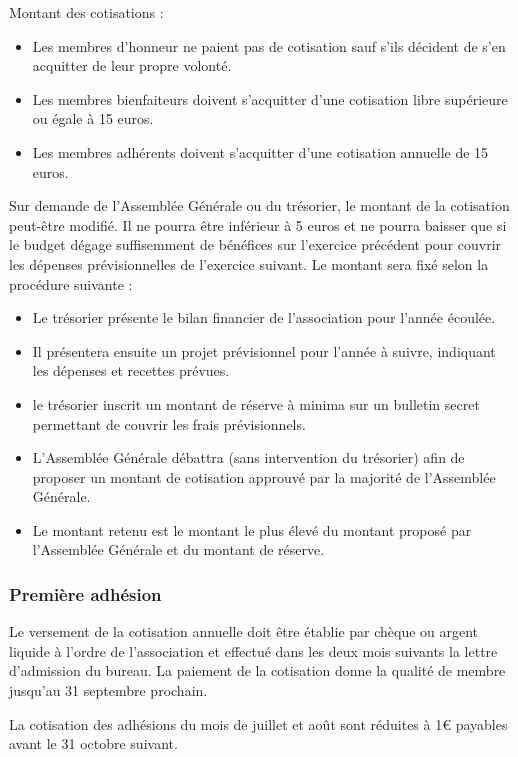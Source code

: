 \documentclass[a4paper,french,10pt]{article}
\begin{document}
Montant des cotisations :

\begin{itemize}
\item Les membres d'honneur ne paient pas de cotisation sauf s'ils décident de s'en acquitter de leur propre volonté.
\item Les membres bienfaiteurs doivent s'acquitter d'une cotisation libre supérieure ou égale à 15 euros.
\item Les membres adhérents doivent s'acquitter d'une cotisation annuelle de 15 euros.
\end{itemize}


Sur demande de l'Assemblée Générale ou du trésorier, le montant de la cotisation peut-être modifié. Il ne pourra être inférieur à 5 euros et ne pourra baisser que si le budget dégage suffisemment de bénéfices sur l'exercice précédent pour couvrir les dépenses prévisionnelles de l'exercice suivant. Le montant sera fixé selon la procédure suivante :
\begin{itemize}
\item Le trésorier présente le bilan financier de l'association pour l'année écoulée.
\item Il présentera ensuite un projet prévisionnel pour l'année à suivre, indiquant les dépenses et recettes prévues.
\item le trésorier inscrit un montant de réserve à minima sur un bulletin secret permettant de couvrir les frais prévisionnels.
\item L'Assemblée Générale débattra (sans intervention du trésorier) afin de proposer un montant de cotisation approuvé par la majorité de l'Assemblée Générale.
\item Le montant retenu est le montant le plus élevé du montant proposé par l'Assemblée Générale et du montant de réserve.
\end{itemize}

\subsubsection*{Première adhésion}

Le versement de la cotisation annuelle doit être établie par chèque ou argent liquide à l'ordre de l'association et effectué dans les deux mois suivants la lettre d'admission du bureau. La paiement de la cotisation donne la qualité de membre jusqu'au 31 septembre prochain.

La cotisation des adhésions du mois de juillet et août sont réduites à 1\euro{} payables avant le 31 octobre suivant.
\end{document}
